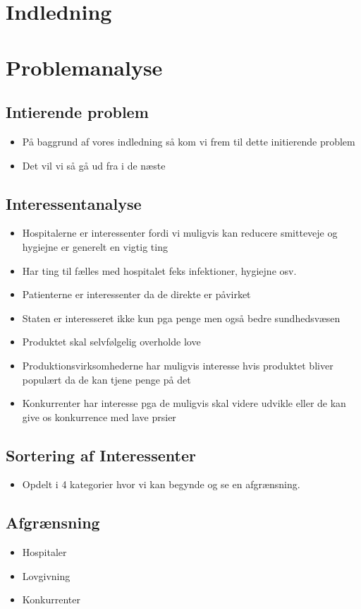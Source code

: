 \documentclass{report}
\begin{document}
\section{Indledning}

\section{Problemanalyse}
\subsection{Intierende problem}
\begin{itemize}
\item På baggrund af vores indledning så kom vi frem til dette initierende problem
\item Det vil vi så gå ud fra i de næste 
\end{itemize}
\subsection{Interessentanalyse}
\begin{itemize}
\item Hospitalerne er interessenter fordi vi muligvis kan reducere smitteveje og hygiejne er generelt en vigtig ting
\item Har ting til fælles med hospitalet feks infektioner, hygiejne osv.
\item Patienterne er interessenter da de direkte er påvirket
\item Staten er interesseret ikke kun pga penge men også bedre sundhedsvæsen
\item Produktet skal selvfølgelig overholde love
\item Produktionsvirksomhederne har muligvis interesse hvis produktet bliver populært da de kan tjene penge på det
\item Konkurrenter har interesse pga de muligvis skal videre udvikle eller de kan give os konkurrence med lave prsier
\end{itemize}
\subsection{Sortering af Interessenter}
\begin{itemize}
\item Opdelt i 4 kategorier hvor vi kan begynde og se en afgrænsning.
\end{itemize}
\subsection{Afgrænsning}
\begin{itemize}
\item Hospitaler
\item Lovgivning
\item Konkurrenter
\end{itemize}
\end{document}
